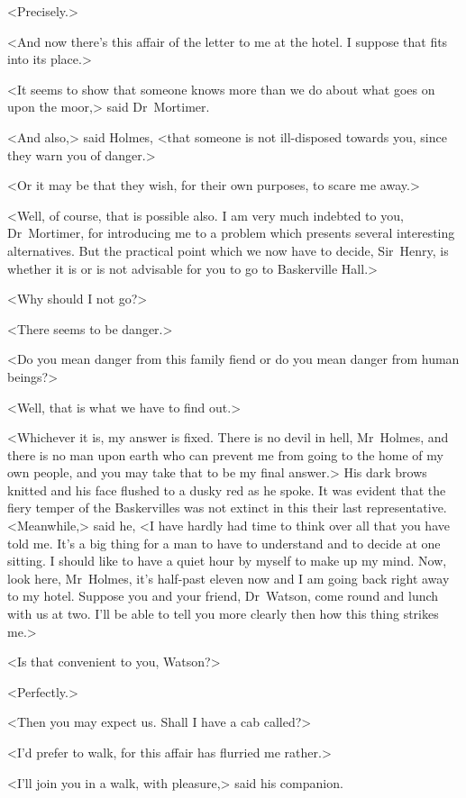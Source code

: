 <Precisely.>

<And now there's this affair of the letter to me at the hotel. I suppose that fits into its place.>

<It seems to show that someone knows more than we do about what goes on upon the moor,> said Dr~Mortimer.

<And also,> said Holmes, <that someone is not ill-disposed towards you, since they warn you of danger.>

<Or it may be that they wish, for their own purposes, to scare me away.>

<Well, of course, that is possible also. I am very much indebted to you, Dr~Mortimer, for introducing me to a problem which presents several interesting alternatives. But the practical point which we now have to decide, Sir~Henry, is whether it is or is not advisable for you to go to Baskerville Hall.>

<Why should I not go?>

<There seems to be danger.>

<Do you mean danger from this family fiend or do you mean danger from human beings?>

<Well, that is what we have to find out.>

<Whichever it is, my answer is fixed. There is no devil in hell, Mr~Holmes, and there is no man upon earth who can prevent me from going to the home of my own people, and you may take that to be my final answer.> His dark brows knitted and his face flushed to a dusky red as he spoke. It was evident that the fiery temper of the Baskervilles was not extinct in this their last representative. <Meanwhile,> said he, <I have hardly had time to think over all that you have told me. It's a big thing for a man to have to understand and to decide at one sitting. I should like to have a quiet hour by myself to make up my mind. Now, look here, Mr~Holmes, it's half-past eleven now and I am going back right away to my hotel. Suppose you and your friend, Dr~Watson, come round and lunch with us at two. I'll be able to tell you more clearly then how this thing strikes me.>

<Is that convenient to you, Watson?>

<Perfectly.>

<Then you may expect us. Shall I have a cab called?>

<I'd prefer to walk, for this affair has flurried me rather.>

<I'll join you in a walk, with pleasure,> said his companion.

